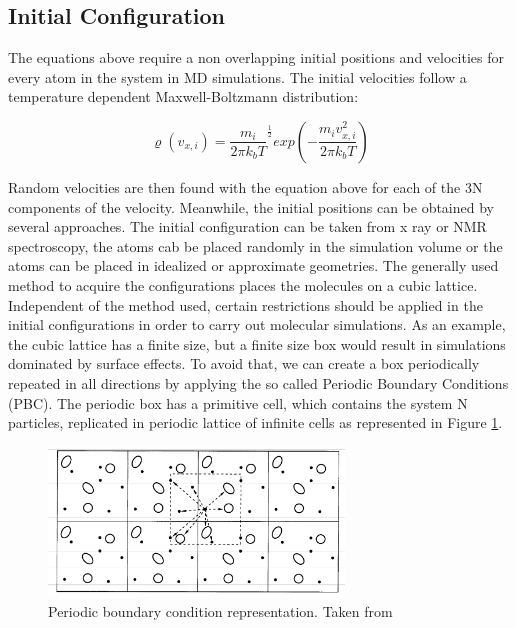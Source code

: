 \subsection{Initial Configuration}

The equations above require a non overlapping initial positions and velocities for every atom in the system in MD simulations. The initial velocities follow a temperature dependent Maxwell-Boltzmann distribution:

\begin{equation}
\varrho (v_{x,i}) = {\frac{m_{i}}{2 \pi k_{b} T}}^{\frac{1}{2}} exp(-\frac{m_{i}v_{x,i}^2}{2 \pi k_{b} T})
\end{equation}

Random velocities are then found with the equation above for each of the 3N components of the velocity. Meanwhile, the initial positions can be obtained by several approaches. The initial configuration can be taken from x ray or NMR spectroscopy, the atoms cab be placed randomly in the simulation volume or the atoms can be placed in idealized or approximate geometries. The  generally used method to acquire the configurations places the molecules on a cubic lattice. Independent of the method used, certain restrictions should be applied in the initial configurations in order to carry out molecular simulations. As an example, the cubic lattice has a finite size, but  a finite size box would result in simulations dominated by surface effects. To avoid that, we can create a box periodically repeated in all directions by applying the so called Periodic Boundary Conditions (PBC). The periodic box has a primitive cell, which contains the system N particles, replicated in periodic lattice of infinite cells as represented in Figure \ref{fig:pbc}\cite{frenkel}.

\begin{figure}
	\centering
	\includegraphics[width=0.7\textwidth]{Figures/pbc}
	\caption{Periodic boundary condition representation. Taken from }
	\label{fig:pbc}
\end{figure}
\FloatBarrier
